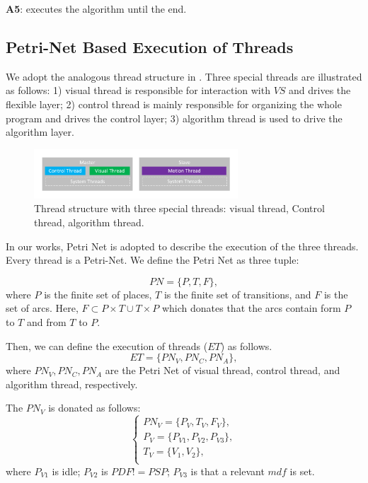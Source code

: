 \documentclass[journal,UTF8]{IEEEtran}
\begin{document}
\textbf{A5}: executes the algorithm until the end. 

\subsection{Petri-Net Based Execution of Threads}
We adopt the analogous thread structure in \cite{wu2018customized}. Three special threads are illustrated as follows: 1) visual thread is responsible for interaction with $VS$ and drives the flexible layer; 2) control thread is mainly responsible for organizing the whole program and drives the control layer; 3) algorithm thread is used to drive the algorithm layer.

\begin{figure}
	\centering
	\includegraphics[width=3in]{fig/Threads.pdf}
	\caption{ Thread structure with three special threads: visual thread, Control thread, algorithm thread.}
	\label{fig:Threads}
\end{figure}

  In our works, Petri Net is adopted to describe the execution of the three threads. Every thread is a Petri-Net. We define the Petri Net as three tuple:
 
 \begin{equation}
PN = \{P,T,F\},
 \end{equation} 
 where $P$ is the finite set of places, $T$ is the finite set of transitions, and $F$ is the set of arcs. Here, $F \subset P\times T \cup T\times P$ which donates that the arcs contain form $P$ to $T$ and from $T$ to $P$.
 
 Then, we can define the execution of threads ($ET$) as follows.
 \begin{equation}
ET = \{PN_V,PN_C,PN_A\},
\end{equation} 
where $PN_V,PN_C,PN_A$ are the Petri Net of visual thread, control thread, and algorithm thread, respectively.

The $PN_V$ is donated as follows:
 \begin{equation}
\left\{
\begin{array}{l}
PN_V= \{P_V,T_V,F_V\},\\
P_V=\{P_{V1}, P_{V2}, P_{V3}\},\\
T_V=\{V_1,V_2\},\\
\end{array}
\right.
\end{equation} 
where $P_{V1}$ is idle; $P_{V2}$ is $PDF != PSP$; $P_{V3}$ is that a relevant $mdf$ is set.
\end{document}
